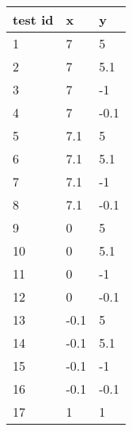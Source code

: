\documentclass[letterpaper]{article}
\begin{document}
\begin{adjustbox}{center}
	\begin{tabular}{lll}
		test id & x    & y    \\ \hline
		1       & 7    & 5    \\
		2       & 7    & 5.1  \\
		3       & 7    & -1   \\
		4       & 7    & -0.1 \\
		5       & 7.1  & 5    \\
		6       & 7.1  & 5.1  \\
		7       & 7.1  & -1   \\
		8       & 7.1  & -0.1 \\
		9       & 0    & 5    \\
		10      & 0    & 5.1  \\
		11      & 0    & -1   \\
		12      & 0    & -0.1 \\
		13      & -0.1 & 5    \\
		14      & -0.1 & 5.1  \\
		15      & -0.1 & -1   \\
		16      & -0.1 & -0.1 \\
		17      & 1    & 1    \\
	\end{tabular}
\end{adjustbox}
\end{document}
